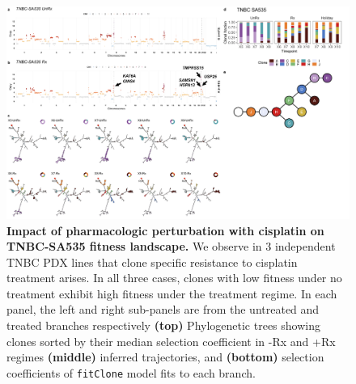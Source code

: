 \begin{figure}
\centering
\includegraphics[width=\textwidth]{Figures/chap4/genePlot535.png}
	
\caption[Impact of pharmacologic perturbation with cisplatin on TNBC-SA535 fitness landscape.]
	{\small
	\textbf{Impact of pharmacologic perturbation with cisplatin on TNBC-SA535 fitness landscape.}
	     We observe in 3 independent TNBC PDX lines that clone specific resistance to cisplatin treatment arises. In all three cases, clones with low fitness under no treatment exhibit high fitness under the treatment regime. In each panel, the left and right sub-panels are from the untreated and treated branches respectively \textbf{(top)} Phylogenetic trees showing clones sorted by their median selection coefficient in -Rx and +Rx regimes  \textbf{(middle)} inferred trajectories, and  \textbf{(bottom)} selection coefficients of \texttt{fitClone} model fits to each branch.
	}
	\label{fig:genotype535cisplatin}
\end{figure}


